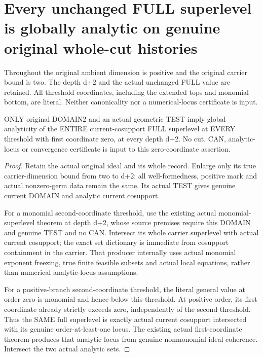 \section{Every unchanged FULL superlevel is globally analytic on genuine original whole-cut histories}

Throughout the original ambient dimension is positive and the original carrier
bound is two. The depth d+2 and the actual unchanged FULL value are retained.
All threshold coordinates, including the extended tops and monomial bottom,
are literal. Neither canonicality nor a numerical-locus certificate is input.

\begin{theorem}
\label{hir:original-test-zero-full-superlevels-analytic}
\leanok
ONLY original DOMAIN2 and an actual geometric TEST imply global analyticity
of the ENTIRE current-cosupport FULL superlevel at EVERY threshold with first
coordinate zero, at every depth d+2. No cut, CAN, analytic-locus or convergence
certificate is input to this zero-coordinate assertion.
\end{theorem}
\begin{proof}
Retain the actual original ideal and its whole record. Enlarge only its true
carrier-dimension bound from two to d+2; all well-formedness, positive mark
and actual nonzero-germ data remain the same. Its actual TEST gives genuine
current DOMAIN and analytic current cosupport.

For a monomial second-coordinate threshold, use the existing actual
monomial-superlevel theorem at depth d+2, whose source premises require this
DOMAIN and genuine TEST and no CAN. Intersect its whole carrier superlevel
with actual current cosupport; the exact set dictionary is immediate from
cosupport containment in the carrier. That producer internally uses actual
monomial exponent freezing, true finite feasible subsets and actual local
equations, rather than numerical analytic-locus assumptions.

For a positive-branch second-coordinate threshold, the literal general value
at order zero is monomial and hence below this threshold. At positive order,
its first coordinate already strictly exceeds zero, independently of the
second threshold. Thus the SAME full superlevel is exactly actual current
cosupport intersected with its genuine order-at-least-one locus. The existing
actual first-coordinate theorem produces that analytic locus from genuine
nonmonomial ideal coherence. Intersect the two actual analytic sets.
\end{proof}


